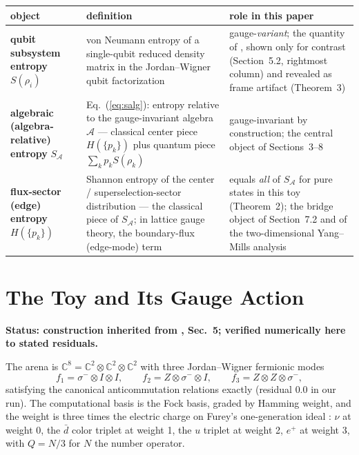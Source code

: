 \documentclass[11pt]{article}
\newcommand{\CC}{\mathbb{C}}
\newcommand{\Alg}{\mathcal{A}}
\newcommand{\SA}{S_{\mathcal{A}}}
\begin{document}
\begin{center}
\small
\begin{tabular}{p{3.4cm}p{5.3cm}p{5.3cm}}
\hline
object & definition & role in this paper \\
\hline
\textbf{qubit subsystem entropy} $S(\rho_i)$ & von Neumann entropy of a single-qubit reduced density matrix in the Jordan--Wigner qubit factorization & gauge-\emph{variant}; the quantity of \cite{companion}, shown only for contrast (Section~5.2, rightmost column) and revealed as frame artifact (Theorem~3) \\
\textbf{algebraic (algebra-relative) entropy} $\SA$ & Eq.~(\ref{eq:salg}): entropy relative to the gauge-invariant algebra $\Alg$ --- classical center piece $H(\{p_k\})$ plus quantum piece $\sum_k p_k S(\rho_k)$ & gauge-invariant by construction; the central object of Sections~3--8 \\
\textbf{flux-sector (edge) entropy} $H(\{p_k\})$ & Shannon entropy of the center / superselection-sector distribution --- the classical piece of $\SA$; in lattice gauge theory, the boundary-flux (edge-mode) term & equals \emph{all} of $\SA$ for pure states in this toy (Theorem~2); the bridge object of Section~7.2 and of the two-dimensional Yang--Mills analysis \cite{ym2companion} \\
\hline
\end{tabular}
\end{center}

\section{The Toy and Its Gauge Action}

\textbf{Status: construction inherited from \cite{companion}, Sec.~5; verified numerically here to stated residuals.}

The arena is $\CC^8 = \CC^2 \otimes \CC^2 \otimes \CC^2$ with three Jordan--Wigner fermionic modes
\begin{equation*}
f_1 = \sigma^- \otimes I \otimes I, \qquad
f_2 = Z \otimes \sigma^- \otimes I, \qquad
f_3 = Z \otimes Z \otimes \sigma^-,
\end{equation*}
satisfying the canonical anticommutation relations exactly (residual $0.0$ in our run). The computational basis is the Fock basis, graded by Hamming weight, and the weight is three times the electric charge on Furey's one-generation ideal \cite{furey14, furey18, stoica}: $\nu$ at weight 0, the $\bar d$ color triplet at weight 1, the $u$ triplet at weight 2, $e^+$ at weight 3, with $Q = N/3$ for $N$ the number operator.
\end{document}
